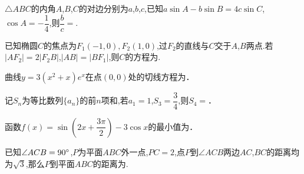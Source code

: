 \documentclass[windows,list]{BHCexam}
\begin{document}
\begin{groups}
\begin{questions}[]
\begin{minipage}{\linewidth}
\begin{solution}{4cm}
\end{solution}
\end{minipage}
\vfill
\begin{minipage}{\linewidth}
\question[5] $\triangle ABC$的内角$A$,$B$,$C$的对边分别为$a$,$b$,$c$,已知$a\sin A-b\sin B=4c\sin C$,$\cos A=- \dfrac {1}{4}$,则$ \dfrac {b}{c} =$.
\begin{solution}{4cm}

\end{solution}
\end{minipage}
\vfill
\begin{minipage}{\linewidth}
\question[5] 已知椭圆$C$的焦点为${F}_{1}( - 1,0),{F}_{2}(1,0)$,过$F _{2}$的直线与$C$交于$A$,$B$两点$.$若$|A{F}_{2}|=2|{F}_{2}B|$,$|AB|=|B{F}_{1}|$,则$C$的方程为.
\begin{solution}{4cm}

\end{solution}
\end{minipage}
\vfill
\end{questions}

\begin{questions}[]
\begin{minipage}{\linewidth}
\question[5]  曲线$y=3(x ^{2} +x)e ^{x}$在点$(0 , 0)$处的切线方程为．
\begin{solution}{4cm}

\end{solution}
\end{minipage}
\vfill
\begin{minipage}{\linewidth}
\question[5]  记$S _{n}$为等比数列$\{a _{n} \}$的前$n$项和,若$a _{1} =1$,$S _{3} = \dfrac{3}{4}$,则$S _{4} =$．
\begin{solution}{4cm}

\end{solution}
\end{minipage}
\vfill
\begin{minipage}{\linewidth}
\question[5]  函数$f(x)=\sin(2x+ \dfrac{3\pi}{2} )-3\cos x$的最小值为．
\begin{solution}{4cm}

\end{solution}
\end{minipage}
\vfill
\begin{minipage}{\linewidth}
\question[5] 已知$ \angle ACB=90^{\small \circ}$,$P$为平面$ABC$外一点,$PC=2$,点$P$到$ \angle ACB$两边$AC$,$BC$的距离均为$\sqrt{3}$,那么$P$到平面$ABC$的距离为.
\begin{solution}{4cm}


\end{solution}
\end{minipage}
\end{questions}
\end{groups}
\end{document}
